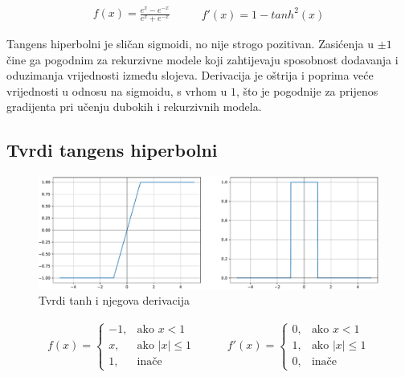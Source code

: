 \documentclass[times, utf8, numeric, diplomski]{fer}
\begin{document}
\begin{equation}
\label{eq:tanh}
\begin{split}
f(x) = \frac{e^x - e^{-x}}{e^x + e^{-x}}
\end{split}
\qquad
\begin{split}
f'(x) = 1 - tanh^2(x)
\end{split}
\end{equation}

Tangens hiperbolni je sličan sigmoidi, no nije strogo pozitivan. Zasićenja u $\pm 1$ čine ga pogodnim za rekurzivne modele koji zahtijevaju sposobnost dodavanja i oduzimanja vrijednosti između slojeva. Derivacija je oštrija i poprima veće vrijednosti u odnosu na sigmoidu, s vrhom u $1$, što je pogodnije za prijenos gradijenta pri učenju dubokih i rekurzivnih modela.

\subsection{Tvrdi tangens hiperbolni}

\begin{figure}[H]
\includegraphics[width=\textwidth]{func_Hard_tanh.pdf}
\centering
\caption{Tvrdi tanh i njegova derivacija}
\label{fig:hard_tanh}
\end{figure}

\begin{equation}
\label{eq:htanh}
\begin{split}
f(x) =
\begin{cases}
-1,	 		& \text{ako } x < 1 \\
x,	 		& \text{ako } |x| \leq 1 \\
1,	& \text{inače}
\end{cases}
\end{split}
\qquad
\begin{split}
f'(x) =
\begin{cases}
0,	 		& \text{ako } x < 1 \\
1,	 		& \text{ako } |x| \leq 1 \\
0,	& \text{inače}
\end{cases}
\end{split}
\end{equation}
\end{document}
